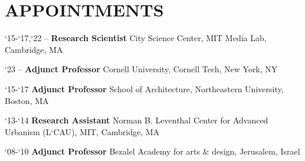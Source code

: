 \section*{APPOINTMENTS}

\begin{tablist}

    \item[`15-`17,`22 --]\tab\textbf{Research Scientist}
    City Science Center, MIT Media Lab, Cambridge, MA

    \item[`23 --]\tab\textbf{Adjunct Professor}
    Cornell University, Cornell Tech, New York, NY

    \item[`15-`17]\tab\textbf{Adjunct Professor}
    School of Architecture, Northeastern University, Boston, MA

    \item[`13-`14]\tab\textbf{Research Assistant}
    Norman B. Leventhal Center for Advanced Urbanism (L`CAU), MIT, Cambridge, MA


    \item[`08-`10]\tab\textbf{Adjunct Professor}
    Bezalel Academy for arts \& design, Jerusalem, Israel


\end{tablist}
